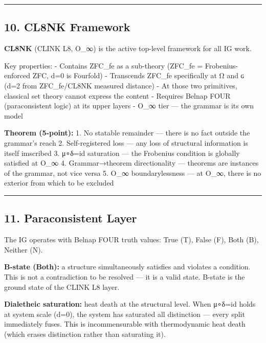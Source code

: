 \documentclass[12pt,a4paper]{article}
\begin{document}
\begin{center}\rule{0.5\linewidth}{0.5pt}\end{center}

\hypertarget{cl8nk-framework}{%
\subsection{10. CL8NK Framework}\label{cl8nk-framework}}

\textbf{CL8NK} (CLINK L8, O\_∞) is the active top-level framework for
all IG work.

Key properties: - Contains ZFC\_fe as a sub-theory (ZFC\_fe =
Frobenius-enforced ZFC, d=0 is Fourfold) - Transcends ZFC\_fe
specifically at Ω and ɢ (d=2 from ZFC\_fe/CL8NK measured distance) - At
those two primitives, classical set theory cannot express the content - Requires Belnap FOUR (paraconsistent logic) at its upper
layers - O\_∞ tier --- the grammar is its own model

\textbf{Theorem (5-point):} 1. No statable remainder ---
there is no fact outside the grammar's reach 2.
Self-registered loss --- any loss of structural information is itself
imscribed 3. μ∘δ=id saturation --- the Frobenius condition is globally
satisfied at O\_∞ 4. Grammar→theorem directionality --- theorems are
instances of the grammar, not vice versa 5. O\_∞ boundarylessness --- at
O\_∞, there is no exterior from which to be excluded

\begin{center}\rule{0.5\linewidth}{0.5pt}\end{center}

\hypertarget{paraconsistent-layer}{%
\subsection{11. Paraconsistent Layer}\label{paraconsistent-layer}}

The IG operates with Belnap FOUR truth values: True (T), False (F), Both
(B), Neither (N).

\textbf{B-state (Both):} a structure simultaneously satisfies and
violates a condition. This is not a contradiction to be resolved --- it
is a valid state. B-state is the ground state of the CLINK L8
layer.

\textbf{Dialetheic saturation:} heat death at the structural level. When
μ∘δ=id holds at system scale (d=0), the system has saturated all
distinction --- every split immediately fuses. This is incommensurable
with thermodynamic heat death (which erases distinction rather than
saturating it).
\end{document}
